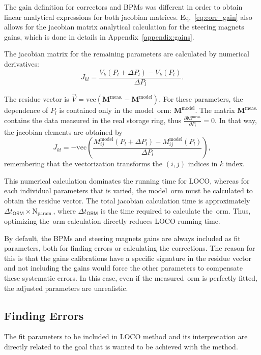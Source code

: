 The gain definition for correctors and BPMs was different in order to obtain linear analytical expressions for both jacobian matrices. Eq.~\eqref{eq:corr_gain} also allows for the jacobian matrix analytical calculation for the steering magnets gains, which is done in details in Appendix~\ref{appendix:gains}. 

The jacobian matrix for the remaining parameters are calculated by numerical derivatives:
\begin{equation}
    J_{kl} = \dfrac{V_{k}\left(P_{l} + \Delta P_{l}\right) - V_{k}\left(P_{l}\right)}{\Delta P_{l}}.
\end{equation}

The residue vector is $\vec{V} = \mathrm{vec}\left(\mathbf{M}^{\mathrm{meas.}} - \mathbf{M}^{\mathrm{model}}\right)$. For these parameters, the dependence of $P_l$ is contained only in the model~\gls{orm}: $\mathbf{M}^{\mathrm{model}}$. The matrix $\mathbf{M}^{\mathrm{meas.}}$ contains the data measured in the real storage ring, thus $\frac{\partial\mathbf{M}^{\mathrm{meas.}}}{\partial P_l} = 0$. In that way, the jacobian elements are obtained by
\begin{equation}
    J_{kl} = -\mathrm{vec}\left(\dfrac{M_{ij}^{\mathrm{model}}\left(P_{l} + \Delta P_{l}\right) - M_{ij}^{\mathrm{model}}\left(P_{l}\right)}{\Delta P_{l}}\right),
\end{equation}
remembering that the vectorization transforms the $(i, j)$ indices in $k$ index.

This numerical calculation dominates the running time for LOCO, whereas for each individual parameters that is varied, the model~\gls{orm} must be calculated to obtain the residue vector. The total jacobian calculation time is approximately $\Delta t_{\mathsf{ORM}} \times \mathrm{N}_{\mathrm{param.}}$, where $\Delta t_{\mathsf{ORM}}$ is the time required to calculate the~\gls{orm}. Thus, optimizing the~\gls{orm} calculation directly reduces LOCO running time. 

By default, the BPMs and steering magnets gains are always included as fit parameters, both for finding errors or calculating the corrections. The reason for this is that the gains calibrations have a specific signature in the residue vector and not including the gains would force the other parameters to compensate these systematic errors. In this case, even if the measured~\gls{orm} is perfectly fitted, the adjusted parameters are unrealistic. 
\subsection{Finding Errors}
The fit parameters to be included in LOCO method and its interpretation are directly related to the goal that is wanted to be achieved with the method. 

